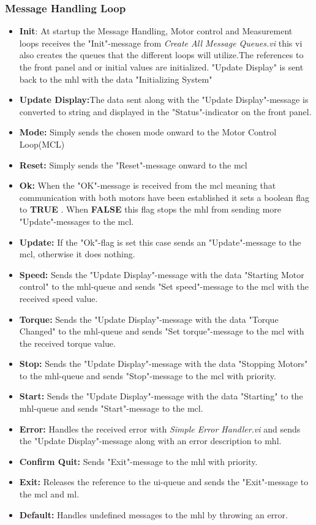 \documentclass{ol-softwaremanual}
\newcommand{\true}{\textbf{TRUE} }
\newcommand{\false}{\textbf{FALSE} }
\begin{document}
\subsubsection*{Message Handling Loop}

\begin{itemize}
    \item \textbf{Init}: At startup the Message Handling, Motor control and Measurement loops receives the "Init"-message from \textit{Create All Message Queues.vi} this vi also creates the queues that the different loops will utilize.The references to the front panel and or initial values are initialized. "Update Display" is sent back to the \acrshort{mhl} with the data "Initializing System"
    \item \textbf{Update Display:}The data sent along with the "Update Display"-message is converted to string and displayed in the "Status"-indicator on the front panel.
    \item \textbf{Mode:} Simply sends the chosen mode onward to the Motor Control Loop(MCL)
    \item \textbf{Reset:} Simply sends the "Reset"-message onward to the \acrshort{mcl}
    \item \textbf{Ok:} When the "OK"-message is received from the \acrshort{mcl} meaning that communication with both motors have been established it sets a boolean flag to \true. When \false this flag stops the \acrshort{mhl} from sending more "Update"-messages to the \acrshort{mcl}. 
    \item \textbf{Update:} If the "Ok"-flag is set this case sends an "Update"-message to the \acrshort{mcl}, otherwise it does nothing.
    \item \textbf{Speed:} Sends the "Update Display"-message with the data "Starting Motor control" to the \acrshort{mhl}-queue and sends "Set speed"-message to the \acrshort{mcl} with the received speed value. 
    \item \textbf{Torque:} Sends the "Update Display"-message with the data "Torque Changed" to the \acrshort{mhl}-queue and sends "Set torque"-message to the \acrshort{mcl} with the received torque value. 
    \item \textbf{Stop:} Sends the "Update Display"-message with the data "Stopping Motors" to the \acrshort{mhl}-queue and sends "Stop"-message to the \acrshort{mcl} with priority. 
    \item \textbf{Start:} Sends the "Update Display"-message with the data "Starting" to the \acrshort{mhl}-queue and sends "Start"-message to the \acrshort{mcl}. 
    \item \textbf{Error:} Handles the received error with \textit{Simple Error Handler.vi} and sends the "Update Display"-message along with an error description to \acrshort{mhl}.   
    \item \textbf{Confirm Quit:} Sends "Exit"-message to the \acrshort{mhl} with priority. 
    \item \textbf{Exit:} Releases the reference to the \acrshort{ui}-queue and sends the "Exit"-message to the \acrshort{mcl} and \acrshort{ml}.
    \item \textbf{Default:} Handles undefined messages to the \acrshort{mhl} by throwing an error. 
\end{itemize}
\end{document}
